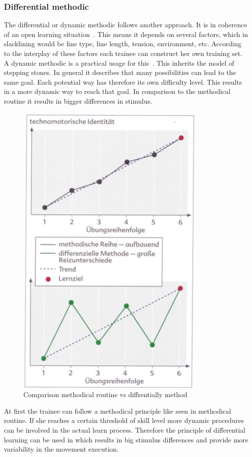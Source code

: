\subsubsection{Differential methodic}
The differential or dynamic methodic follows another approach. It is in coherence of an open learning situation~\cite{Thomann2013-aa}. This means it depends on several factors, which in slacklining would be line type, line length, tension, environment, etc. According to the interplay of these factors each trainee can construct her own training set. A dynamic methodic is a practical usage for this~\cite{Beck2008-dl, Schoellhorn1999-ip}. This inherits the model of stepping stones. In general it describes that many possibilities can lead to the same goal. Each potential way has therefore its own difficulty level. This results in a more dynamic way to reach that goal. In comparison to the methodical routine it results in bigger differences in stimulus. 

\begin{figure}[htb]
	\centering
	\begin{minipage}[t]{1\linewidth}
		\centering
		\includegraphics[width=0.4\linewidth]{Pictures/3_3_1_comparisonMethods}
		\caption{Comparison methodical routine vs diffrentially method~\cite{Thomann2013-aa}}
		\label{fig:3_3_1_comparisonMethods}
	\end{minipage}
\end{figure}
At first the trainee can follow a methodical principle like seen in methodical routine. If she reaches a certain threshold of skill level more dynamic procedures can be involved in the actual learn process. Therefore the principle of differential learning can be used in which results in big stimulus differences and provide more variability in the movement execution.

